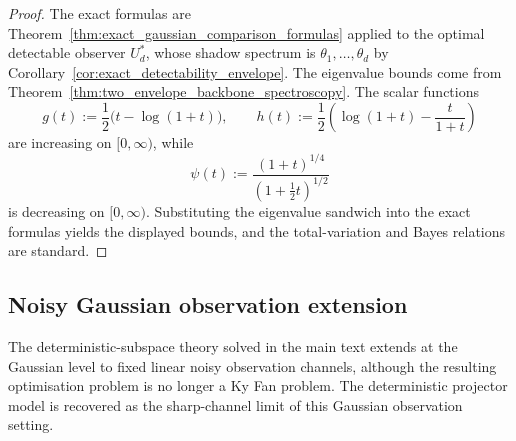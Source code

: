 \documentclass[11pt,a4paper]{article}
\numberwithin{equation}{section}
\theoremstyle{thmcompact}
\theoremstyle{remark}
\begin{document}
\begin{proof}
The exact formulas are Theorem~\ref{thm:exact_gaussian_comparison_formulas} applied to the optimal detectable observer \(U_d^\ast\), whose shadow spectrum is \(\theta_1,\dots,\theta_d\) by Corollary~\ref{cor:exact_detectability_envelope}. The eigenvalue bounds come from Theorem~\ref{thm:two_envelope_backbone_spectroscopy}. The scalar functions
\begin{equation}
g(t):=\frac12\bigl(t-\log(1+t)\bigr),
\qquad
h(t):=\frac12\left(\log(1+t)-\frac{t}{1+t}\right)
\end{equation}
are increasing on \([0,\infty)\), while
\begin{equation}
\psi(t):=\frac{(1+t)^{1/4}}{(1+\tfrac12 t)^{1/2}}
\end{equation}
is decreasing on \([0,\infty)\). Substituting the eigenvalue sandwich into the exact formulas yields the displayed bounds, and the total-variation and Bayes relations are standard.
\end{proof}

\subsection{Noisy Gaussian observation extension}

The deterministic-subspace theory solved in the main text extends at the Gaussian level to fixed linear noisy observation channels, although the resulting optimisation problem is no longer a Ky Fan problem. The deterministic projector model is recovered as the sharp-channel limit of this Gaussian observation setting.
\end{document}
